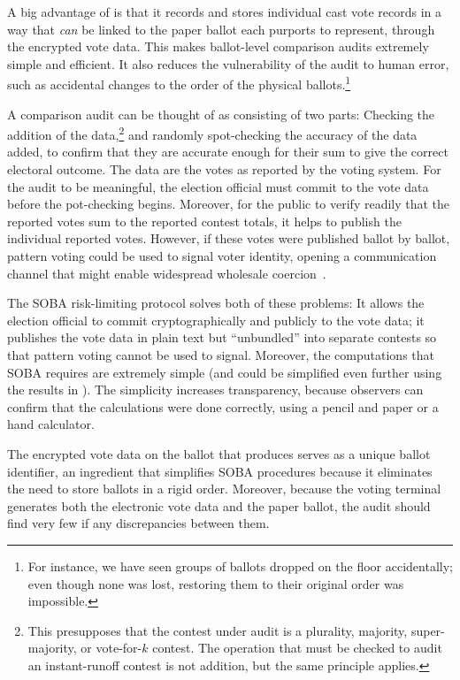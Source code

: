 A big advantage of \projname is that it records and stores individual cast vote records in a way that 
{\em can\/} be linked to
the paper ballot each purports to represent, through the encrypted vote data.
This makes ballot-level comparison audits extremely simple and efficient.
It also reduces the vulnerability of the audit to human error, such as accidental changes to the order
of the physical ballots.\footnote{%
   For instance, we have seen groups of ballots dropped on the floor accidentally;
   even though none was lost, restoring them to their original order was impossible.
}

A comparison audit can be thought of as consisting of two parts:
Checking the addition of the data,\footnote{%
   This presupposes that the contest under audit is a plurality, majority, super-majority, or vote-for-$k$
   contest.
   The operation that must be checked to audit an instant-runoff contest is not addition, but the
   same principle applies.
}
and randomly spot-checking the accuracy of the data added, to confirm that they are accurate
enough for their sum to give the correct electoral outcome.
The data are the votes as reported by the voting system.
For the audit to be meaningful, the election official must commit to the vote data before the
pot-checking begins.
Moreover, for the public to verify readily that the reported votes sum to the reported contest totals,
it helps to publish the individual reported votes.
However, if these votes were published ballot by ballot, pattern voting could be used to signal voter identity,
opening a communication channel that might enable 
widespread wholesale coercion~\cite{rescorla09,benalohEtal11}.

The SOBA risk-limiting protocol \cite{benalohEtal11} solves both of these problems:
It allows the election official to commit cryptographically and publicly to the vote data; it publishes
the vote data in plain text but ``unbundled'' into separate contests so that pattern voting cannot
be used to signal.
Moreover, the computations that SOBA requires are extremely simple (and could be simplified
even further using the results in \cite{lindemanStark12}).
The simplicity increases transparency, because observers can confirm that the calculations
were done correctly, using a pencil and paper or a hand calculator.

The encrypted vote data on the ballot that \projname produces serves as a unique ballot identifier,
an ingredient that simplifies SOBA procedures because it eliminates the need to store ballots in a rigid order.
Moreover, because the voting terminal generates both the electronic vote data and the paper ballot, 
the audit should find very few if any discrepancies between them.

